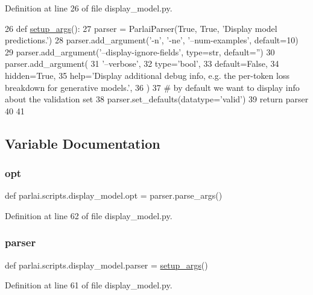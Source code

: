 Definition at line 26 of file display\+\_\+model.\+py.


\begin{DoxyCode}
26 \textcolor{keyword}{def }\hyperlink{namespaceparlai_1_1scripts_1_1display__model_a9141f8dde0f690b4d641fe08c193e2b5}{setup\_args}():
27     parser = ParlaiParser(\textcolor{keyword}{True}, \textcolor{keyword}{True}, \textcolor{stringliteral}{'Display model predictions.'})
28     parser.add\_argument(\textcolor{stringliteral}{'-n'}, \textcolor{stringliteral}{'-ne'}, \textcolor{stringliteral}{'--num-examples'}, default=10)
29     parser.add\_argument(\textcolor{stringliteral}{'--display-ignore-fields'}, type=str, default=\textcolor{stringliteral}{''})
30     parser.add\_argument(
31         \textcolor{stringliteral}{'--verbose'},
32         type=\textcolor{stringliteral}{'bool'},
33         default=\textcolor{keyword}{False},
34         hidden=\textcolor{keyword}{True},
35         help=\textcolor{stringliteral}{'Display additional debug info, e.g. the per-token loss breakdown for generative models.'},
36     )
37     \textcolor{comment}{# by default we want to display info about the validation set}
38     parser.set\_defaults(datatype=\textcolor{stringliteral}{'valid'})
39     \textcolor{keywordflow}{return} parser
40 
41 
\end{DoxyCode}


\subsection{Variable Documentation}
\mbox{\label{namespaceparlai_1_1scripts_1_1display__model_a53054dd9ddcd16817b6dde616a4236c5}} 
\subsubsection{\texorpdfstring{opt}{opt}}
{\footnotesize\ttfamily def parlai.\+scripts.\+display\+\_\+model.\+opt = parser.\+parse\+\_\+args()}



Definition at line 62 of file display\+\_\+model.\+py.

\mbox{\label{namespaceparlai_1_1scripts_1_1display__model_a34f269d469b91fcaf21a045c6f4a3598}} 
\subsubsection{\texorpdfstring{parser}{parser}}
{\footnotesize\ttfamily def parlai.\+scripts.\+display\+\_\+model.\+parser = \hyperlink{namespaceparlai_1_1scripts_1_1display__model_a9141f8dde0f690b4d641fe08c193e2b5}{setup\+\_\+args}()}



Definition at line 61 of file display\+\_\+model.\+py.

